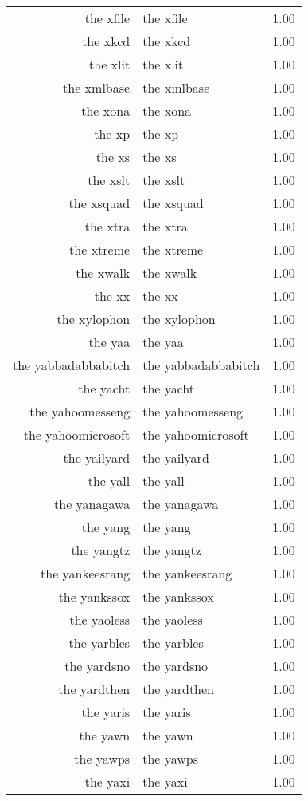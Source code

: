 \begin{table}[ht]
\begin{tabular}{rlr}
  the xfile & the xfile & 1.00 \\ 
  the xkcd & the xkcd & 1.00 \\ 
  the xlit & the xlit & 1.00 \\ 
  the xmlbase & the xmlbase & 1.00 \\ 
  the xona & the xona & 1.00 \\ 
  the xp & the xp & 1.00 \\ 
  the xs & the xs & 1.00 \\ 
  the xslt & the xslt & 1.00 \\ 
  the xsquad & the xsquad & 1.00 \\ 
  the xtra & the xtra & 1.00 \\ 
  the xtreme & the xtreme & 1.00 \\ 
  the xwalk & the xwalk & 1.00 \\ 
  the xx & the xx & 1.00 \\ 
  the xylophon & the xylophon & 1.00 \\ 
  the yaa & the yaa & 1.00 \\ 
  the yabbadabbabitch & the yabbadabbabitch & 1.00 \\ 
  the yacht & the yacht & 1.00 \\ 
  the yahoomesseng & the yahoomesseng & 1.00 \\ 
  the yahoomicrosoft & the yahoomicrosoft & 1.00 \\ 
  the yailyard & the yailyard & 1.00 \\ 
  the yall & the yall & 1.00 \\ 
  the yanagawa & the yanagawa & 1.00 \\ 
  the yang & the yang & 1.00 \\ 
  the yangtz & the yangtz & 1.00 \\ 
  the yankeesrang & the yankeesrang & 1.00 \\ 
  the yankssox & the yankssox & 1.00 \\ 
  the yaoless & the yaoless & 1.00 \\ 
  the yarbles & the yarbles & 1.00 \\ 
  the yardsno & the yardsno & 1.00 \\ 
  the yardthen & the yardthen & 1.00 \\ 
  the yaris & the yaris & 1.00 \\ 
  the yawn & the yawn & 1.00 \\ 
  the yawps & the yawps & 1.00 \\ 
  the yaxi & the yaxi & 1.00 \\ 

\end{tabular}
\end{table}
